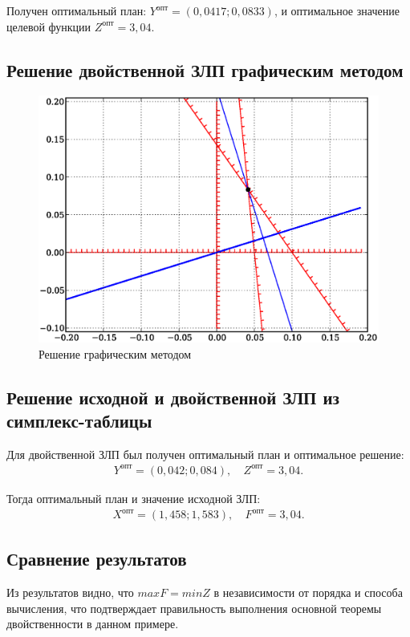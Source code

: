 Получен оптимальный план: $Y^{опт} = (0,0417;0,0833)$, и оптимальное значение целевой функции $Z^{опт} = 3,04$.

\subsection{Решение двойственной ЗЛП графическим методом}
\begin{figure}[ht]
\centering
\includegraphics[width=\textwidth]{img/12}
\caption{Решение графическим методом}\label{11}
\end{figure}

\subsection{Решение исходной и двойственной ЗЛП из симплекс-таблицы}
Для двойственной ЗЛП был получен оптимальный план и оптимальное решение:
\begin{align*}
	Y^{опт} = (0,042; 0,084),&~ Z^{опт} = 3,04.
\end{align*}

Тогда оптимальный план и значение исходной ЗЛП:
\begin{align*}
	X^{опт} = (1,458;1,583),&~ F^{опт} = 3,04.
\end{align*}

\subsection{Сравнение результатов}
Из результатов видно, что $max F = min Z$ в независимости от порядка и способа
вычисления, что подтверждает правильность выполнения
основной теоремы двойственности в данном примере.